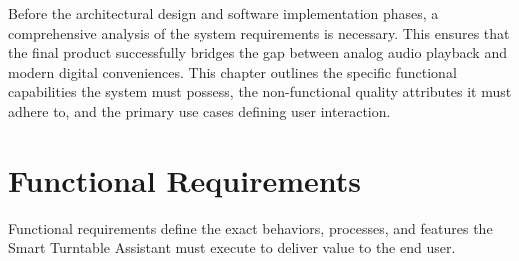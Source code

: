 \documentclass[12pt,a4paper,english]{report}
\begin{document}
Before the architectural design and software implementation phases, a comprehensive analysis of the system requirements is necessary. This ensures that the final product successfully bridges the gap between analog audio playback and modern digital conveniences. This chapter outlines the specific functional capabilities the system must possess, the non-functional quality attributes it must adhere to, and the primary use cases defining user interaction.

\section{Functional Requirements}

Functional requirements define the exact behaviors, processes, and features the Smart Turntable Assistant must execute to deliver value to the end user.
\end{document}
